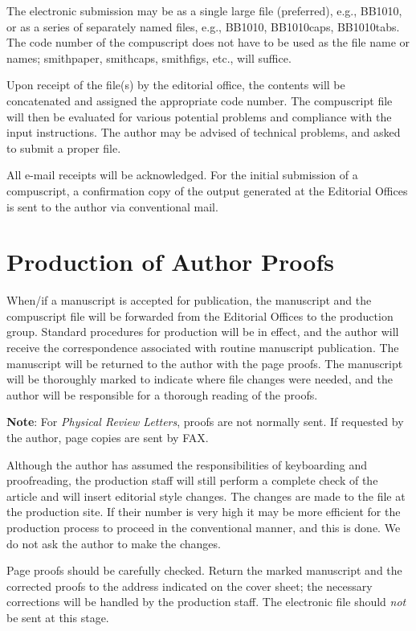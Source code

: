 The electronic submission may be as a single large file (preferred), e.g.,
BB1010, or as a series of separately named files, e.g., BB1010, BB1010caps,
BB1010tabs. The code number of the compuscript does not have to be used as
the file name or names; smithpaper, smithcaps, smithfigs, etc., will
suffice.

Upon receipt of the file(s) by the editorial office, the contents will be
concatenated and assigned the appropriate code number. The compuscript file
will then be evaluated for various potential problems and compliance with
the input instructions.  The author may be advised of technical problems,
and asked to submit a proper file.

All e-mail receipts will be acknowledged. For the initial submission of a
compuscript, a confirmation copy of the output generated at the Editorial
Offices is sent to the author via conventional mail.

\section{Production of Author Proofs}
\label{sec:process}

When/if a manuscript is accepted for publication, the manuscript and the
compuscript file will be forwarded from the Editorial Offices to the
production group. Standard  procedures for  production will be in effect,
and the author will  receive the correspondence associated with routine
manuscript publication. The manuscript will be returned to the author with
the page proofs.  The manuscript will be thoroughly marked to indicate
where file changes were needed, and the author will be responsible for a
thorough reading of the proofs.

{\bf Note}: For {\em Physical Review Letters}, proofs are not normally
sent. If requested by the author, page copies are sent by FAX.

Although the author has assumed the responsibilities of keyboarding and
proofreading, the production staff will still perform a complete check of
the article and will insert editorial style changes. The changes are made
to the file at the production site. If their number is very high it may be
more efficient for the production process to proceed in the conventional
manner, and this is done. We do not ask the author to make the changes.

Page proofs should be carefully checked.  Return the marked manuscript and
the corrected proofs to the address indicated on the cover sheet; the
necessary corrections will be  handled by the production staff. The
electronic file should {\em not\/} be sent at this stage.

